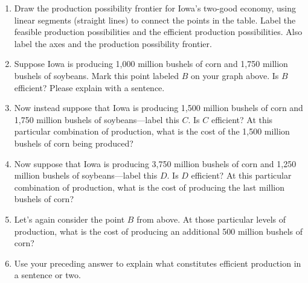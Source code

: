 \documentclass[
    letterpaper,paper=portrait,fleqn,
    DIV=16,fontsize=12pt,twoside=semi,
    parskip=full-,
    headings=standardclasses]
{scrartcl}
\begin{document}
\begin{enumerate}

\item Draw the production possibility frontier for Iowa's two-good economy, using linear segments (straight lines) to connect the points in the table. Label the feasible production possibilities and the efficient production possibilities. Also label the axes and the production possibility frontier.

\begin{center}
\end{center}

\item Suppose Iowa is producing 1,000 million bushels of corn and 1,750 million bushels of soybeans. Mark this point labeled $B$ on your graph above. Is $B$ efficient? Please explain with a sentence.


\vfill

\item Now instead suppose that Iowa is producing 1,500 million bushels of corn and 1,750 million bushels of soybeans---label this $C$. Is $C$ efficient? At this particular combination of production, what is the cost of the 1,500 million bushels of corn being produced?

\vfill

\item Now suppose that Iowa is producing 3,750 million bushels of corn and 1,250 million bushels of soybeans---label this $D.$ Is $D$ efficient? At this particular combination of production, what is the cost of producing the last million bushels of corn?

\vfill

\item Let's again consider the point $B$ from above. At those particular levels of production, what is the cost of producing an additional 500 million bushels of corn?

\vfill

\item Use your preceding answer to explain what constitutes efficient production in a sentence or two.

\vfill

\vspace{-4\baselineskip}

\end{enumerate}
\end{document}
